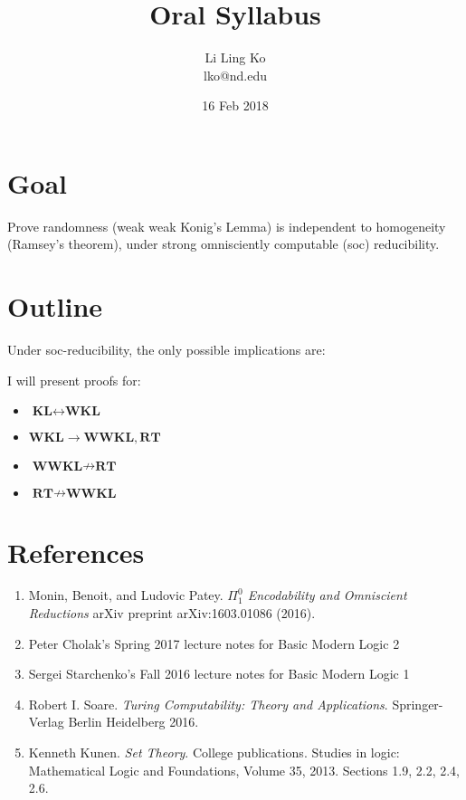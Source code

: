 \documentclass{article}
\begin{document}
\title{Oral Syllabus}
\author{Li Ling Ko\\ lko@nd.edu}
\date{16 Feb 2018}
\maketitle

\section{Goal}
Prove randomness (weak weak Konig's Lemma) is independent to homogeneity
(Ramsey's theorem), under strong omnisciently computable (soc) reducibility.

\section{Outline}
Under soc-reducibility, the only possible implications are:
\begin{center}
\end{center}

\noindent
I will present proofs for:
\begin{itemize}
  \item $\textbf{KL} \leftrightarrow \textbf{WKL}$
  \item $\textbf{WKL} \rightarrow \textbf{WWKL}, \textbf{RT}$
  \item $\textbf{WWKL} \nrightarrow \textbf{RT}$
  \item $\textbf{RT} \nrightarrow \textbf{WWKL}$
\end{itemize}

\section{References}
\begin{enumerate}
  \item Monin, Benoit, and Ludovic Patey. \textit{$\Pi_1^0$ Encodability and
    Omniscient Reductions} arXiv preprint arXiv:1603.01086 (2016).
  \item Peter Cholak's Spring 2017 lecture notes for Basic Modern Logic 2
  \item Sergei Starchenko's Fall 2016 lecture notes for Basic Modern Logic
    1
  \item Robert I. Soare. \textit{Turing Computability: Theory and
    Applications}. Springer-Verlag Berlin Heidelberg 2016.
  \item Kenneth Kunen. \textit{Set Theory}. College publications. Studies
    in logic: Mathematical Logic and Foundations, Volume 35, 2013. Sections
    1.9, 2.2, 2.4, 2.6.
\end{enumerate}
\end{document}

